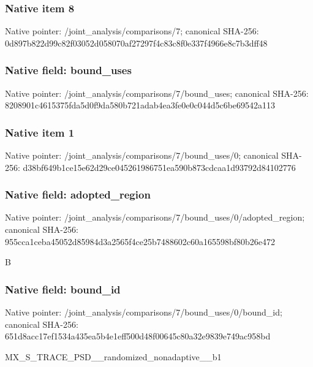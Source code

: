 \documentclass[10pt,a4paper]{article}
\begin{document}
\begingroup\raggedright{}\par\endgroup

\subsubsection{Native item 8}
Native pointer: /joint\_\allowbreak{}analysis/comparisons/7; canonical SHA-256: 0d897b822d99c82f03052d058070af27297f4c83c8f0e337f4966e8c7b3dff48

\subsubsection{Native field: bound\_\allowbreak{}uses}
Native pointer: /joint\_\allowbreak{}analysis/comparisons/7/bound\_\allowbreak{}uses; canonical SHA-256: 8208901c4615375fda5d0f9da580b721adab4ea3fe0e0c044d5c6be69542a113

\subsubsection{Native item 1}
Native pointer: /joint\_\allowbreak{}analysis/comparisons/7/bound\_\allowbreak{}uses/0; canonical SHA-256: d38bf649b1ce15e62d29ce045261986751ea590b873cdcaa1d93792d84102776

\subsubsection{Native field: adopted\_\allowbreak{}region}
Native pointer: /joint\_\allowbreak{}analysis/comparisons/7/bound\_\allowbreak{}uses/0/adopted\_\allowbreak{}region; canonical SHA-256: 955cca1ceba45052d85984d3a2565f4ce25b7488602c60a165598bf80b26e472

\begingroup\raggedright\sloppy B\par\endgroup

\subsubsection{Native field: bound\_\allowbreak{}id}
Native pointer: /joint\_\allowbreak{}analysis/comparisons/7/bound\_\allowbreak{}uses/0/bound\_\allowbreak{}id; canonical SHA-256: 651d8acc17ef1534a435ea5b4e1eff500d48f00645c80a32e9839e749ac958bd

\begingroup\raggedright\sloppy MX\_\allowbreak{}S\_\allowbreak{}TRACE\_\allowbreak{}PSD\_\allowbreak{}\_\allowbreak{}randomized\_\allowbreak{}nonadaptive\_\allowbreak{}\_\allowbreak{}b1\par\endgroup
\end{document}
